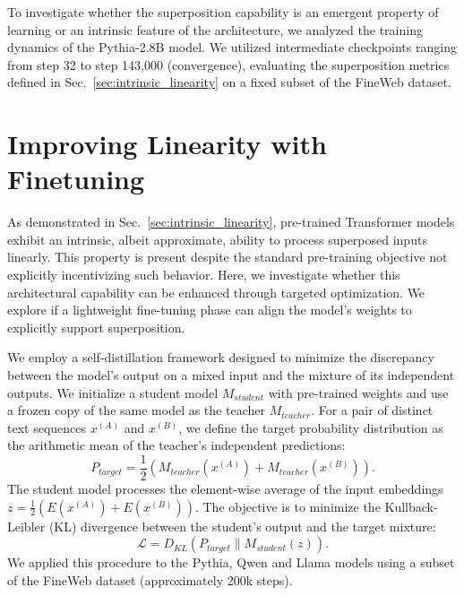 \documentclass{article}
\theoremstyle{plain}
\theoremstyle{definition}
\theoremstyle{remark}
\begin{document}
To investigate whether the superposition capability is an emergent property of learning or an intrinsic feature of the architecture, we analyzed the training dynamics of the Pythia-2.8B model. We utilized intermediate checkpoints ranging from step 32 to step 143,000 (convergence), evaluating the superposition metrics defined in Sec.~\ref{sec:intrinsic_linearity} on a fixed subset of the FineWeb dataset.

\section{Improving Linearity with Finetuning}
\label{sec:improving_linearity}

As demonstrated in Sec.~\ref{sec:intrinsic_linearity}, pre-trained Transformer models exhibit an intrinsic, albeit approximate, ability to process superposed inputs linearly. This property is present despite the standard pre-training objective not explicitly incentivizing such behavior. Here, we investigate whether this architectural capability can be enhanced through targeted optimization. We explore if a lightweight fine-tuning phase can align the model's weights to explicitly support superposition.

We employ a self-distillation framework designed to minimize the discrepancy between the model's output on a mixed input and the mixture of its independent outputs. We initialize a student model $M_{student}$ with pre-trained weights and use a frozen copy of the same model as the teacher $M_{teacher}$. For a pair of distinct text sequences $x^{(A)}$ and $x^{(B)}$, we define the target probability distribution as the arithmetic mean of the teacher's independent predictions:
\begin{equation}
    P_{target} = \frac{1}{2} \left( M_{teacher}(x^{(A)}) + M_{teacher}(x^{(B)}) \right).
\end{equation}
The student model processes the element-wise average of the input embeddings $z = \frac{1}{2}(E(x^{(A)}) + E(x^{(B)}))$. The objective is to minimize the Kullback-Leibler (KL) divergence between the student's output and the target mixture:
\begin{equation}
    \mathcal{L} = D_{KL}\left( P_{target} \parallel M_{student}(z) \right).
\end{equation}
We applied this procedure to the Pythia, Qwen and Llama models using a subset of the FineWeb dataset (approximately 200k steps).
\end{document}

